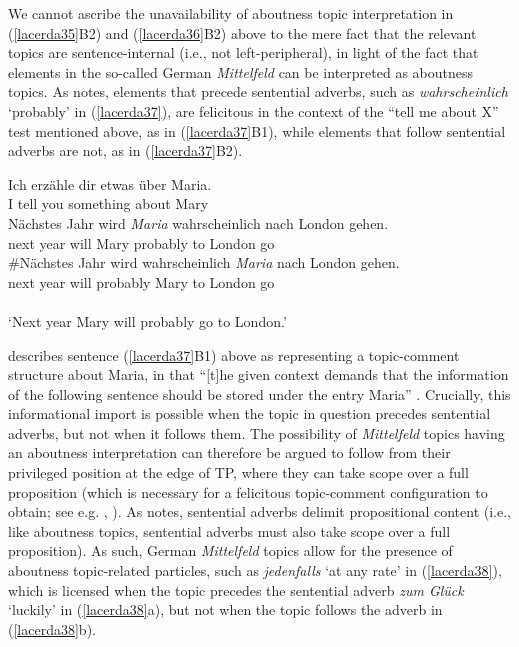 \documentclass[output=paper]{langscibook}
\begin{document}
We cannot ascribe the unavailability of aboutness topic interpretation in (\ref{lacerda35}B2) and (\ref{lacerda36}B2) above to the mere fact that the relevant topics are sentence-internal (i.e., not left-peripheral), in light of the fact that elements in the so-called German \emph{Mittelfeld} can be interpreted as aboutness topics. As \citet{Frey2004} notes, elements that precede sentential adverbs, such as \emph{wahrscheinlich} ‘probably’ in (\ref{lacerda37}), are felicitous in the context of the “tell me about X” test mentioned above, as in (\ref{lacerda37}B1), while elements that follow sentential adverbs are not, as in (\ref{lacerda37}B2).

\begin{exe}
\ex \label{lacerda37}
\begin{xlist}
 \label{lacerda37A}
\gll Ich 	erzähle 	dir 	etwas 	über 	Maria.\\
I 	tell 	you 	something 	about 	Mary\\
 \label{lacerda37B1}
\gll Nächstes 	Jahr 	wird 	\emph{Maria} 	wahrscheinlich 	nach 	London 	gehen.\\
next 	year 	will 	Mary 	probably 	to 	London 	go\\

 \label{lacerda37B2}
\gll \#Nächstes 	Jahr 	wird 	wahrscheinlich 	\emph{Maria} 	nach 	London 	gehen.\\
next 	year 	will 	probably 	Mary 	to 	London 	go\\\\
‘Next year Mary will probably go to London.’\\
\citep[158]{Frey2004}
\end{xlist}
\end{exe}

\citet{Frey2004} describes sentence (\ref{lacerda37}B1) above as representing a topic-comment structure about Maria, in that “[t]he given context demands that the information of the following sentence should be stored under the entry Maria” \citep[158]{Frey2004}. Crucially, this informational import is possible when the topic in question precedes sentential adverbs, but not when it follows them. The possibility of \emph{Mittelfeld} topics having an aboutness interpretation can therefore be argued to follow from their privileged position at the edge of TP, where they can take scope over a full proposition (which is necessary for a felicitous topic-comment configuration to obtain; see e.g. \citealt{Reinhart1981}, \citealt{BianchiFrascarelli2010}). As \citet{Frey2003, Frey2004} notes, sentential adverbs delimit propositional content (i.e., like aboutness topics, sentential adverbs must also take scope over a full proposition). As such, German \emph{Mittelfeld} topics allow for the presence of aboutness topic-related particles, such as \emph{jedenfalls} ‘at any rate’ in (\ref{lacerda38}), which is licensed when the topic precedes the sentential adverb \emph{zum Glück} ‘luckily’ in (\ref{lacerda38}a), but not when the topic follows the adverb in (\ref{lacerda38}b).
\end{document}
